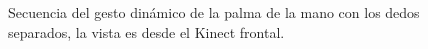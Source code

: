 \begin{figure}[h!]
\begin{center}
\end{center}
\caption{Secuencia del gesto dinámico de la palma de la mano con los dedos separados, la vista es desde el Kinect frontal.}
\label{fig:G3}
\end{figure}

